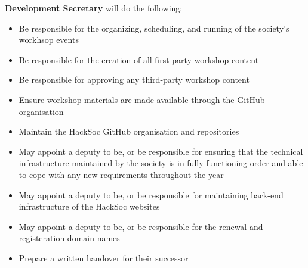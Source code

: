 \item \textbf{Development Secretary} will do the following: 
\begin{itemize}
  \item Be responsible for the organizing, scheduling, and running of the society's workhsop events
  \item Be responsible for the creation of all first-party workshop content
  \item Be responsible for approving any third-party workshop content
  \item Ensure workshop materials are made available through the GitHub organisation
  \item Maintain the HackSoc GitHub organisation and repositories
  \item May appoint a deputy to be, or be responsible for ensuring that the technical infrastructure maintained by the society is in fully functioning order and able to cope with any new requirements throughout the year
  \item May appoint a deputy to be, or be responsible for maintaining back-end infrastructure of the HackSoc websites
  \item May appoint a deputy to be, or be responsible for the renewal and registeration domain names
  \item Prepare a written handover for their successor
\end{itemize}
